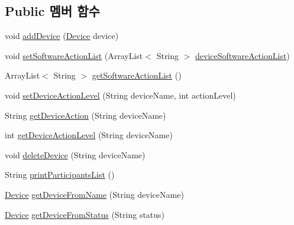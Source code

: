 \subsection*{Public 멤버 함수}
\begin{DoxyCompactItemize}
\item 
void \mbox{\hyperlink{classcom_1_1github_1_1aites_1_1framework_1_1orchestration_1_1_participants_aa739db866e3ec3b741fc4005b620694a}{add\+Device}} (\mbox{\hyperlink{classcom_1_1github_1_1aites_1_1framework_1_1orchestration_1_1_device}{Device}} device)
\item 
void \mbox{\hyperlink{classcom_1_1github_1_1aites_1_1framework_1_1orchestration_1_1_participants_aa5c13f562d712ebaa0ff363f650731ae}{set\+Software\+Action\+List}} (Array\+List$<$ String $>$ \mbox{\hyperlink{classcom_1_1github_1_1aites_1_1framework_1_1orchestration_1_1_participants_ac53ce12002e42b5ed3b6ff38afbbaf01}{device\+Software\+Action\+List}})
\item 
Array\+List$<$ String $>$ \mbox{\hyperlink{classcom_1_1github_1_1aites_1_1framework_1_1orchestration_1_1_participants_ad8cff5b48970cc4ca491545e09a94047}{get\+Software\+Action\+List}} ()
\item 
void \mbox{\hyperlink{classcom_1_1github_1_1aites_1_1framework_1_1orchestration_1_1_participants_a01e1793359d254af92377896fcb9be1d}{set\+Device\+Action\+Level}} (String device\+Name, int action\+Level)
\item 
String \mbox{\hyperlink{classcom_1_1github_1_1aites_1_1framework_1_1orchestration_1_1_participants_aad2cb3cd7db30459a1ef894f2c9b333f}{get\+Device\+Action}} (String device\+Name)
\item 
int \mbox{\hyperlink{classcom_1_1github_1_1aites_1_1framework_1_1orchestration_1_1_participants_a513cf30ee884a0ccb53e2edc613a622e}{get\+Device\+Action\+Level}} (String device\+Name)
\item 
void \mbox{\hyperlink{classcom_1_1github_1_1aites_1_1framework_1_1orchestration_1_1_participants_a4f57c5d5f0c622b7668c55ad4a02def9}{delete\+Device}} (String device\+Name)
\item 
String \mbox{\hyperlink{classcom_1_1github_1_1aites_1_1framework_1_1orchestration_1_1_participants_a3f8b65344bf9bca47538ddb270646476}{print\+Participants\+List}} ()
\item 
\mbox{\hyperlink{classcom_1_1github_1_1aites_1_1framework_1_1orchestration_1_1_device}{Device}} \mbox{\hyperlink{classcom_1_1github_1_1aites_1_1framework_1_1orchestration_1_1_participants_a9fc55eba9746f4e2fb91158f9c278262}{get\+Device\+From\+Name}} (String device\+Name)
\item 
\mbox{\hyperlink{classcom_1_1github_1_1aites_1_1framework_1_1orchestration_1_1_device}{Device}} \mbox{\hyperlink{classcom_1_1github_1_1aites_1_1framework_1_1orchestration_1_1_participants_a705edd6ae52990deec865f2178a0735e}{get\+Device\+From\+Status}} (String status)
\end{DoxyCompactItemize}
